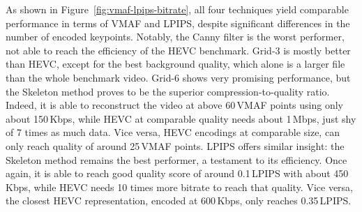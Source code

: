 \documentclass[manuscript, screen]{acmart}
\begin{document}
As shown in Figure~\ref{fig:vmaf-lpips-bitrate}, all four techniques yield comparable performance in terms of VMAF and LPIPS, despite significant differences in the number of encoded keypoints. Notably, the Canny filter is the worst performer, not able to reach the efficiency of the HEVC benchmark. Grid-3 is mostly better than HEVC, except for the best background quality, which alone is a larger file than the whole benchmark video. Grid-6 shows very promising performance, but the Skeleton method proves to be the superior compression-to-quality ratio. Indeed, it is able to reconstruct the video at above 60\,VMAF points using only about 150\,Kbps, while HEVC at comparable quality needs about 1\,Mbps, just shy of \num{7} times as much data. Vice versa, HEVC encodings at comparable size, can only reach quality of around 25\,VMAF points.
LPIPS offers similar insight: the Skeleton method remains the best performer, a testament to its efficiency. Once again, it is able to reach good quality score of around 0.1\,LPIPS with about 450\,Kbps, while HEVC needs \num{10} times more bitrate to reach that quality. Vice versa, the closest HEVC representation, encoded at 600\,Kbps, only reaches 0.35\,LPIPS.
\end{document}

